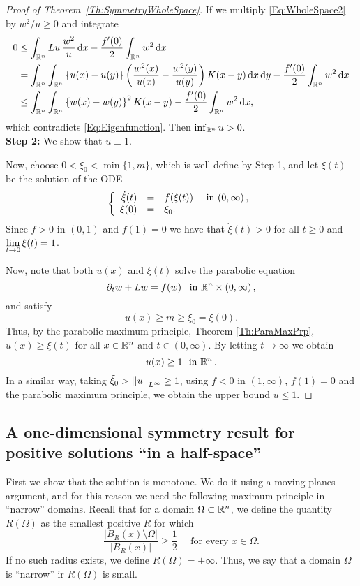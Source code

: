 \begin{proof}[Proof of Theorem~\ref{Th:SymmetryWholeSpace}]
If we multiply \eqref{Eq:WholeSpace2} by $w^2/u\geq 0$ and integrate
\begin{align*}
0 &\leq \int_{\mathbb{R}^n} Lu\,\frac{w^2}{u} \,\mathrm{d} x - \frac{f'(0)}{2}\int_{\mathbb{R}^n} w^2 \,\mathrm{d} x \\
&= \int_{\mathbb{R}^n}\int_{\mathbb{R}^n}\left\{ u(x)-u(y) \right\} \left( \frac{w^2(x)}{u(x)}-\frac{w^2(y)}{u(y)} \right) K(x-y) \,\mathrm{d} x \,\mathrm{d} y - \frac{f'(0)}{2}\int_{\mathbb{R}^n} w^2 \,\mathrm{d} x \\
&\leq \int_{\mathbb{R}^n}\int_{\mathbb{R}^n} \left\{ w(x)-w(y)\right\}^2 K(x-y) - \frac{f'(0)}{2}\int_{\mathbb{R}^n} w^2 \,\mathrm{d} x ,
\end{align*}
which contradicts \eqref{Eq:Eigenfunction}. Then $\inf_{\mathbb{R}^n} u >0$.\\

\textbf{Step 2:} We show that $u\equiv 1$.

Now, choose $0<\xi_0<\min\{1,m\}$, which is well define by Step 1, and let $\xi(t)$ be the solution of the ODE
$$
\left\{\begin{array}{rcll}
\dot{\xi}(t) &=& f(\xi(t)) & \textrm{ in }(0,\infty)\,,\\
\xi(0) &=& \xi_0.
\end{array} \right.
$$
Since $f>0$ in $(0,1)$ and $f(1) = 0$ we have that $\dot{\xi}(t)>0$ for all $t\geq 0$ and $\displaystyle \lim_{t\to 0} \xi(t) = 1$.

Now, note that both $u(x)$ and $\xi(t)$ solve the parabolic equation
$$ \partial_t w + Lw = f(w) \,\,\, \textrm{ in }\mathbb{R}^n\times (0,\infty)\,, $$
and satisfy
$$ u(x) \geq m \geq \xi_0 = \xi(0). $$
Thus, by the parabolic maximum principle, Theorem \ref{Th:ParaMaxPrp}, $u(x)\geq \xi(t)$ for all $x\in\mathbb{R}^n$ and $t\in(0,\infty)$. By letting $t \to \infty$ we obtain
$$ u(x) \geq 1 \,\, \textrm{ in }\mathbb{R}^n\,.  $$
In a similar way, taking $\tilde{\xi}_0>\left | \left |{u} \right | \right |_{L^\infty} \geq 1$, using $f<0$ in $(1,\infty)$, $f(1)=0$ and the parabolic maximum principle, we obtain the upper bound $u\leq 1$.

\end{proof}



\subsection{A one-dimensional symmetry result for positive solutions ``in a half-space''}


First we show that the solution is monotone. We do it using a moving planes argument, and for this reason we need the following maximum principle in ``narrow'' domains. Recall that for a domain $\Omega \subset \mathbb{R}^n$, we define the quantity $R(\Omega)$ as the smallest positive $R$ for which
$$
\dfrac{|B_R(x)\setminus \Omega|}{|B_R(x)|}\geq \dfrac{1}{2} \quad \text{ for every } x \in \Omega.
$$
If no such radius exists, we define $R(\Omega) = +\infty$. Thus, we say that a domain $\Omega$ is ``narrow'' ir $R(\Omega)$ is small.



